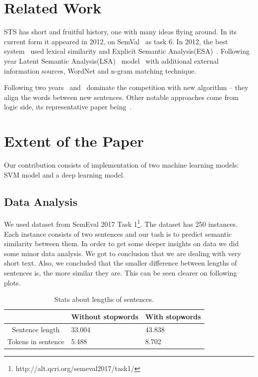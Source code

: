 \documentclass[10pt, a4paper]{article}
\begin{document}
\section{Related Work}

STS has short and fruitful history, one with many ideas flying around. In its current form it appeared in 2012, on SemVal~\citep{agirre2012semeval} as task 6.  In 2012, the best system~\citep{bar2012ukp} used lexical similarity and Explicit Semantic Analysis(ESA)~\citep{gabrilovich2007computing}. Following year Latent Semantic Analysis(LSA)~\citep{deerwester1990indexing} model~\citep{han2013umbc} with additional external information sources, WordNet and n-gram matching technique.

Following two years~\citep{sultan2014dls} and~\citep{sultan2015dls} dominate the competition with new algorithm -- they align the words between new sentences. Other notable approaches come from logic side, its representative paper being~\citep{beltagy2014probabilistic}.

\section{Extent of the Paper}

Our contribution consists of implementation of two machine learning models: SVM model and a deep learning model.

\subsection{Data Analysis}
We used dataset from SemEval 2017
Task 1\footnote{http://alt.qcri.org/semeval2017/task1/}.
The dataset has 250 instances. Each instance consists of two sentences and our tash is to predict semantic similarity between them. In order to get some deeper insights on data we did some minor data analysis. We got to conclusion that we are dealing with very short text. Also, we concluded that the smaller difference between lengths of sentences is, the more similar they are. This can be seen clearer on following plots.

\begin{table}
\caption{Stats about lengths of sentences.}
\label{tab:narrow-table}
\begin{center}
\begin{tabular}{cll}
\toprule
& Without stopwords & With stopwords \\
\midrule
Sentence length & 33.004 & 43.838 \\
Tokens in sentence & 5.488 & 8.702 \\
\bottomrule
\end{tabular}
\end{center}
\end{table}
\end{document}
